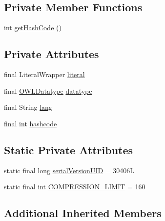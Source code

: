 \subsection*{Private Member Functions}
\begin{DoxyCompactItemize}
\item 
int \hyperlink{classuk_1_1ac_1_1manchester_1_1cs_1_1owl_1_1owlapi_1_1_o_w_l_literal_impl_ad37e68bd92275d7702ec8b0f2431cb31}{get\-Hash\-Code} ()
\end{DoxyCompactItemize}
\subsection*{Private Attributes}
\begin{DoxyCompactItemize}
\item 
final Literal\-Wrapper \hyperlink{classuk_1_1ac_1_1manchester_1_1cs_1_1owl_1_1owlapi_1_1_o_w_l_literal_impl_aadce851c6acf671e9c1f7595c74cb5f3}{literal}
\item 
final \hyperlink{interfaceorg_1_1semanticweb_1_1owlapi_1_1model_1_1_o_w_l_datatype}{O\-W\-L\-Datatype} \hyperlink{classuk_1_1ac_1_1manchester_1_1cs_1_1owl_1_1owlapi_1_1_o_w_l_literal_impl_a62c8d56f44df21a7b1ee4a58f2815044}{datatype}
\item 
final String \hyperlink{classuk_1_1ac_1_1manchester_1_1cs_1_1owl_1_1owlapi_1_1_o_w_l_literal_impl_a3de0bc1d3e12ca115919cdc550bcdcc2}{lang}
\item 
final int \hyperlink{classuk_1_1ac_1_1manchester_1_1cs_1_1owl_1_1owlapi_1_1_o_w_l_literal_impl_aa63d615d2ea9636d5d0413991817f689}{hashcode}
\end{DoxyCompactItemize}
\subsection*{Static Private Attributes}
\begin{DoxyCompactItemize}
\item 
static final long \hyperlink{classuk_1_1ac_1_1manchester_1_1cs_1_1owl_1_1owlapi_1_1_o_w_l_literal_impl_a84ae023641151feb967ec78b9dbdfe13}{serial\-Version\-U\-I\-D} = 30406\-L
\item 
static final int \hyperlink{classuk_1_1ac_1_1manchester_1_1cs_1_1owl_1_1owlapi_1_1_o_w_l_literal_impl_a9dd9fdb2b73b140f24932d8a122fc37d}{C\-O\-M\-P\-R\-E\-S\-S\-I\-O\-N\-\_\-\-L\-I\-M\-I\-T} = 160
\end{DoxyCompactItemize}
\subsection*{Additional Inherited Members}



